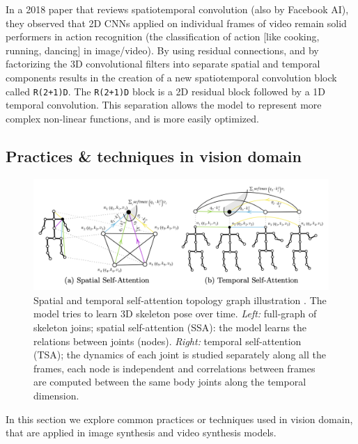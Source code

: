 In a 2018 paper \cite{tran2018closer} that reviews spatiotemporal convolution (also by Facebook AI), they observed that 2D CNNs applied on individual frames of video remain solid performers in action recognition (the classification of action [like cooking, running, dancing] in image/video). By using residual connections, and by factorizing the 3D convolutional filters into separate spatial and temporal components results in the creation of a new spatiotemporal convolution block called \texttt{R(2+1)D}. The \texttt{R(2+1)D} block is a 2D residual block followed by a 1D temporal convolution. This separation allows the model to represent more complex non-linear functions, and is more easily optimized.







\subsection{Practices \& techniques in vision domain}

\begin{figure}
    \centering
    \includegraphics[width=1\textwidth]{images/video_synthesis/spatial_and_temporal_self_attention.png}
    \caption{Spatial and temporal self-attention topology graph illustration \cite{plizzari2021spatial}. The model tries to learn 3D skeleton pose over time. \textit{Left:} full-graph of skeleton joins; spatial self-attention (SSA): the model learns the relations between joints (nodes). \textit{Right:} temporal self-attention (TSA); the dynamics of each joint is studied separately along all the frames, each node is independent and correlations between frames are computed between the same body joints along the temporal dimension.}
    \label{fig:spatial_temporal_self_attention}
\end{figure}

In this section we explore common practices or techniques used in vision domain, that are applied in image synthesis and video synthesis models.

